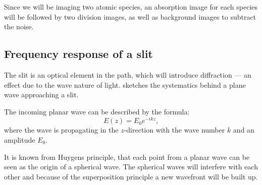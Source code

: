 Since we will be imaging two atomic species, an absorption image for each species will be followed by two division images, as well as background images to subtract the noise.

\subsection{Frequency response of a slit}
\label{subsec:slit}

The slit is an optical element in the path, which will introduce diffraction --- an effect due to the wave nature of light.
 sketches the systematics behind a plane wave approaching a slit.


The incoming planar wave can be described by the formula:
\begin{equation}
E(z) = E_0 e^{-ikz},
\end{equation}
where the wave is propagating in the $z$-direction with the wave number $k$ and an amplitude $E_0$.

It is known from Huygens principle, that each point from a planar wave can be seen as the origin of a spherical wave. The spherical waves will interfere with each other and because of the superposition principle a new wavefront will be built up.

